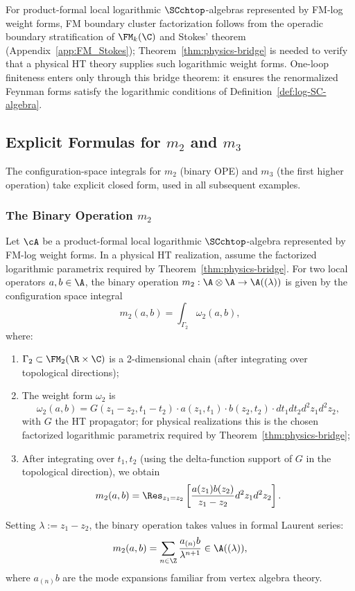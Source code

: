\begin{remark}
\label{rem:loop_corrections}
For product-formal local logarithmic $\SCchtop$-algebras represented by
FM-log weight forms, FM boundary cluster factorization follows from
the operadic boundary stratification of $\FM_k(\C)$ and Stokes'
theorem (Appendix~\ref{app:FM_Stokes}); Theorem~\ref{thm:physics-bridge}
is needed to verify that a physical HT theory supplies such logarithmic
weight forms. One-loop finiteness enters only through this bridge
theorem: it ensures the renormalized Feynman forms satisfy the
logarithmic conditions of Definition~\ref{def:log-SC-algebra}.
\end{remark}

\subsection{\texorpdfstring{Explicit Formulas for $m_2$ and $m_3$}{Explicit Formulas for m2 and m3}}
\label{sec:explicit_m2_m3}

The configuration-space integrals for $m_2$ (binary OPE) and $m_3$ (the first higher operation) take explicit closed form, used in all subsequent examples.

\subsubsection{\texorpdfstring{The Binary Operation $m_2$}{The Binary Operation m2}}
\begin{proposition}
\label{prop:m2_formula}
Let\/ $\cA$ be a product-formal local logarithmic\/ $\SCchtop$-algebra
represented by FM-log weight forms. In a physical HT realization,
assume the factorized logarithmic parametrix required by
Theorem~\ref{thm:physics-bridge}.
For two local operators $a, b \in \A$, the binary operation $m_2 : \A \otimes \A \to \A((\lambda))$ is given by the configuration space integral
\[
m_2(a,b) = \int_{\Gamma_2} \omega_2(a,b),
\]
where:
\begin{enumerate}[label=(\roman*)]
\item $\Gamma_2 \subset \FM_2(\R \times \C)$ is a 2-dimensional chain (after integrating over topological directions);
\item The weight form $\omega_2$ is
\[
\omega_2(a,b) = G(z_1 - z_2, t_1 - t_2) \cdot a(z_1, t_1) \cdot b(z_2, t_2) \cdot dt_1 dt_2 d^2z_1 d^2z_2,
\]
with $G$ the HT propagator; for physical realizations this is the chosen factorized logarithmic parametrix required by Theorem~\ref{thm:physics-bridge};
\item After integrating over $t_1, t_2$ (using the delta-function support of $G$ in the topological direction), we obtain
\[
m_2(a,b) = \Res_{z_1 = z_2} \left[ \frac{a(z_1) b(z_2)}{z_1 - z_2} d^2z_1 d^2z_2 \right].
\]
\end{enumerate}
Setting $\lambda := z_1 - z_2$, the binary operation takes values in formal Laurent series:
\[
m_2(a,b) = \sum_{n \in \Z} \frac{a_{(n)} b}{\lambda^{n+1}} \in \A((\lambda)),
\]
where $a_{(n)} b$ are the mode expansions familiar from vertex algebra theory.
\end{proposition}

